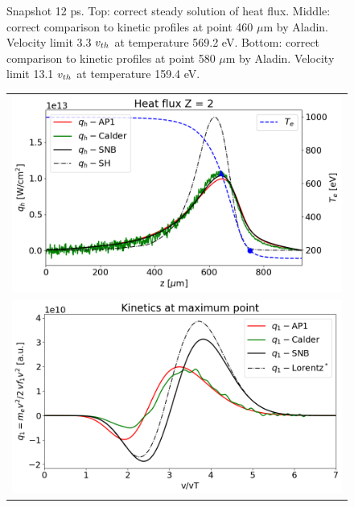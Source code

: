 \begin{figure}[htb]
\begin{center}
\begin{tabular}{c}
    \end{tabular}
  \caption{  
  Snapshot 12 ps. Top: correct steady solution of heat flux.  
  Middle: correct comparison to kinetic profiles at point 460 $\mu$m by Aladin. 
  Velocity limit 3.3 $v_{th}$ at temperature 569.2 eV.
  Bottom: correct comparison to kinetic profiles at point 580 $\mu$m by Aladin.
  Velocity limit 13.1 $v_{th}$ at temperature 159.4 eV.
  }
  \label{fig:C7_Aladin_case3}
  \end{center} 
\end{figure}

\begin{figure}[htb]
  \begin{center}
    \begin{tabular}{c}
      \includegraphics[width=\figscale\textwidth]{../VFPdata/C7_Calder_case1_heatflux.png} 
	  \\ 
	  \includegraphics[width=\figscale\textwidth]{../VFPdata/C7_Calder_case1_kinetics.png}
	  \\ 

\end{tabular}
\end{center}
\end{figure}
